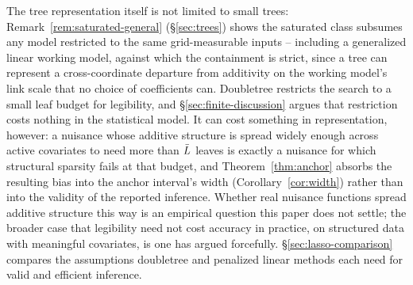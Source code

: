\documentclass[12pt]{article}
\begin{document}
The tree representation itself is not limited to small trees: Remark~\ref{rem:saturated-general} (\S\ref{sec:trees}) shows the saturated class subsumes any model restricted to the same grid-measurable inputs -- including a generalized linear working model, against which the containment is strict, since a tree can represent a cross-coordinate departure from additivity on the working model's link scale that no choice of coefficients can. Doubletree restricts the search to a small leaf budget for legibility, and \S\ref{sec:finite-discussion} argues that restriction costs nothing in the statistical model. It can cost something in representation, however: a nuisance whose additive structure is spread widely enough across active covariates to need more than $\bar{L}$ leaves is exactly a nuisance for which structural sparsity fails at that budget, and Theorem~\ref{thm:anchor} absorbs the resulting bias into the anchor interval's width (Corollary~\ref{cor:width}) rather than into the validity of the reported inference. Whether real nuisance functions spread additive structure this way is an empirical question this paper does not settle; the broader case that legibility need not cost accuracy in practice, on structured data with meaningful covariates, is one \citet{rudin2019} has argued forcefully. \S\ref{sec:lasso-comparison} compares the assumptions doubletree and penalized linear methods each need for valid and efficient inference.
\end{document}
